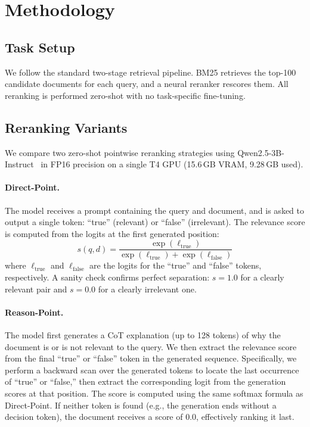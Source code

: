 \documentclass[sigconf,review]{acmart}
\begin{document}
\section{Methodology}

\subsection{Task Setup}

We follow the standard two-stage retrieval pipeline. BM25 retrieves the top-100 candidate documents for each query, and a neural reranker rescores them. All reranking is performed zero-shot with no task-specific fine-tuning.

\subsection{Reranking Variants}

We compare two zero-shot pointwise reranking strategies using Qwen2.5-3B-Instruct~\cite{qwen25tech} in FP16 precision on a single T4 GPU (15.6\,GB VRAM, 9.28\,GB used).

\paragraph{Direct-Point.}
The model receives a prompt containing the query and document, and is asked to output a single token: ``true'' (relevant) or ``false'' (irrelevant). The relevance score is computed from the logits at the first generated position:
\begin{equation}
    s(q, d) = \frac{\exp(\ell_{\text{true}})}{\exp(\ell_{\text{true}}) + \exp(\ell_{\text{false}})}
\end{equation}
where $\ell_{\text{true}}$ and $\ell_{\text{false}}$ are the logits for the ``true'' and ``false'' tokens, respectively. A sanity check confirms perfect separation: $s=1.0$ for a clearly relevant pair and $s=0.0$ for a clearly irrelevant one.

\paragraph{Reason-Point.}
The model first generates a CoT explanation (up to 128 tokens) of why the document is or is not relevant to the query. We then extract the relevance score from the final ``true'' or ``false'' token in the generated sequence. Specifically, we perform a backward scan over the generated tokens to locate the last occurrence of ``true'' or ``false,'' then extract the corresponding logit from the generation scores at that position. The score is computed using the same softmax formula as Direct-Point. If neither token is found (e.g., the generation ends without a decision token), the document receives a score of 0.0, effectively ranking it last.
\end{document}
